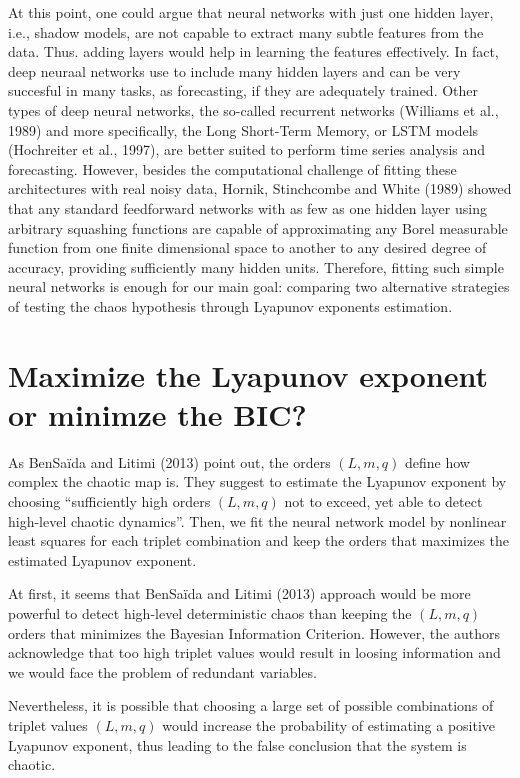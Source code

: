 \documentclass[12pt]{article}
\begin{document}
At this point, one could argue that neural networks with just one hidden layer, i.e., shadow models, are not capable to extract many subtle features from the data. Thus. adding layers would help in learning the features effectively. In fact, deep neuraal networks use to include many hidden layers and can be very succesful in many tasks, as forecasting, if they are adequately trained. Other types of deep neural networks, the so-called recurrent networks (Williams et al., 1989) and more specifically, the Long Short-Term Memory, or LSTM models (Hochreiter et al., 1997), are better suited to perform time series analysis and forecasting. However, besides the computational challenge of fitting these architectures with real noisy data, 
Hornik, Stinchcombe and White (1989) showed that any standard feedforward networks with as few as 
one hidden layer using arbitrary squashing functions are capable of approximating any Borel measurable function
 from one finite dimensional space to another to any desired degree of accuracy, providing sufficiently many hidden units. Therefore, fitting such simple neural networks is enough for our main goal: comparing two alternative strategies of testing the chaos hypothesis through Lyapunov exponents estimation. 


\section{Maximize the Lyapunov exponent or minimze the BIC?}

As BenSa\"{i}da and Litimi (2013) point out, the orders $(L,m,q)$ define how complex the chaotic map is. They suggest to estimate the Lyapunov exponent by choosing ``sufficiently high orders $(L,m,q)$ not to exceed, yet able to detect high-level chaotic dynamics''. Then, we fit the neural network model by nonlinear least squares for each triplet combination and keep the orders that maximizes the estimated Lyapunov exponent.

At first, it seems that BenSa\"{i}da and Litimi (2013) approach would be more powerful to detect high-level deterministic chaos than keeping the $(L,m,q)$ orders that minimizes the Bayesian Information Criterion. However, the authors acknowledge that too high triplet values would result in loosing information and we would face the problem of redundant variables. 

Nevertheless, it is possible that choosing a large set of possible combinations of triplet values $(L,m,q)$ would increase the probability of estimating a positive Lyapunov exponent, thus leading to the false conclusion that the system is chaotic. 
\end{document}
